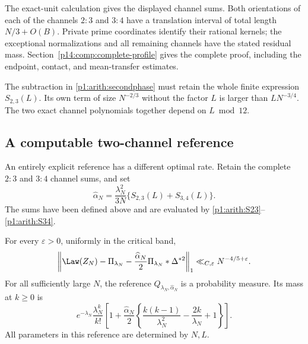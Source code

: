 The exact-unit calculation gives the displayed channel sums. Both
orientations of each of the channels $2:3$ and $3:4$ have a translation
interval of total length $N/3+O(B)$. Private prime coordinates identify
their rational kernels; the exceptional normalizations and all remaining
channels have the stated residual mass. Section~\ref{p14:comp:complete-profile}
gives the complete proof, including the endpoint, contact, and
mean-transfer estimates.

The subtraction in \eqref{p1:arith:secondphase} must retain the whole finite
expression $S_{2,3}(L)$.  Its own term of size $N^{-2/3}$ without the factor
$L$ is larger than $LN^{-3/4}$.  The two exact channel polynomials together
depend on $L\bmod12$.


\subsection{A computable two-channel reference}

An entirely explicit reference has a different optimal rate.
Retain the complete \(2:3\) and \(3:4\) channel sums, and set
\begin{equation}
 \widehat\alpha_N=\frac{\lambda_N^2}{3N}
             \{S_{2,3}(L)+S_{3,4}(L)\}.
 \label{p1:eq:alpha-explicit}
\end{equation}
The sums have been defined above and are evaluated by
\eqref{p1:arith:S23}--\eqref{p1:arith:S34}.

\begin{corollary}
\label{p1:cor:explicit}
For every \(\varepsilon>0\), uniformly in the critical band,
\begin{equation}
 \left\|\Law(Z_N)-\Pi_{\lambda_N}
       -\frac{\widehat\alpha_N}{2}
          \Pi_{\lambda_N}*\Delta^{*2}\right\|_1
       \ll_{C,\varepsilon}N^{-4/5+\varepsilon}.
 \label{p1:eq:explicit-law}
\end{equation}
For all sufficiently large \(N\), the reference
\(Q_{\lambda_N,\widehat\alpha_N}\) is a probability measure.
Its mass at \(k\ge0\) is
\begin{equation}
 e^{-\lambda_N}\frac{\lambda_N^k}{k!}
 \left[
  1+\frac{\widehat\alpha_N}{2}
       \left\{\frac{k(k-1)}{\lambda_N^2}
                    -\frac{2k}{\lambda_N}+1\right\}
 \right].
 \label{p1:eq:explicit-masses}
\end{equation}
All parameters in this reference are determined by \(N,L\).
\end{corollary}

